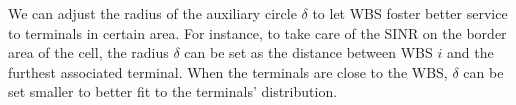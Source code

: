 We can adjust the radius of the auxiliary circle $\delta$ to let WBS foster better service to terminals in certain area.
For instance, to take care of the SINR on the border area of the cell, the radius $\delta$ can be set as the distance between WBS $i$ and the furthest associated terminal.
When the terminals are close to the WBS, $\delta$ can be set smaller to better fit to the terminals' distribution.


